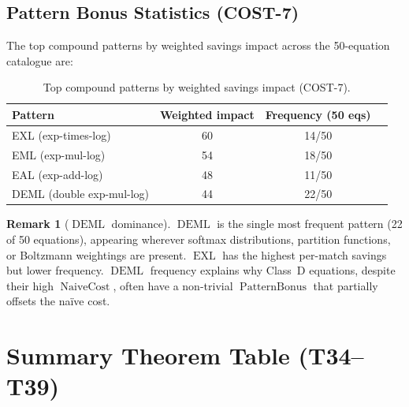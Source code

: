 \documentclass[12pt,a4paper]{article}
\theoremstyle{definition}
\newtheorem{remark}[theorem]{Remark}
\newcommand{\EXL}{\operatorname{EXL}}
\newcommand{\DEML}{\operatorname{DEML}}
\newcommand{\NC}{\operatorname{NaiveCost}}
\newcommand{\PB}{\operatorname{PatternBonus}}
\begin{document}
\subsection{Pattern Bonus Statistics (COST-7)}

The top compound patterns by weighted savings impact across the 50-equation
catalogue are:

\begin{table}[h]
\centering
\caption{Top compound patterns by weighted savings impact (COST-7).}
\label{tab:patterns}
\smallskip
\begin{tabular}{@{}lccc@{}}
\toprule
\textbf{Pattern} & \textbf{Weighted impact} & \textbf{Frequency (50 eqs)} \\
\midrule
EXL (exp-times-log)        & 60 & 14/50 \\
EML (exp-mul-log)          & 54 & 18/50 \\
EAL (exp-add-log)          & 48 & 11/50 \\
DEML (double exp-mul-log)  & 44 & 22/50 \\
\bottomrule
\end{tabular}
\end{table}

\begin{remark}[$\DEML$ dominance]
$\DEML$ is the single most frequent pattern (22 of 50 equations), appearing
wherever softmax distributions, partition functions, or Boltzmann weightings
are present.  $\EXL$ has the highest per-match savings but lower frequency.
$\DEML$ frequency explains why Class~D equations, despite their high $\NC$,
often have a non-trivial $\PB$ that partially offsets the na\"{i}ve cost.
\end{remark}

\section{Summary Theorem Table (T34--T39)}
\label{sec:summary}
\end{document}
